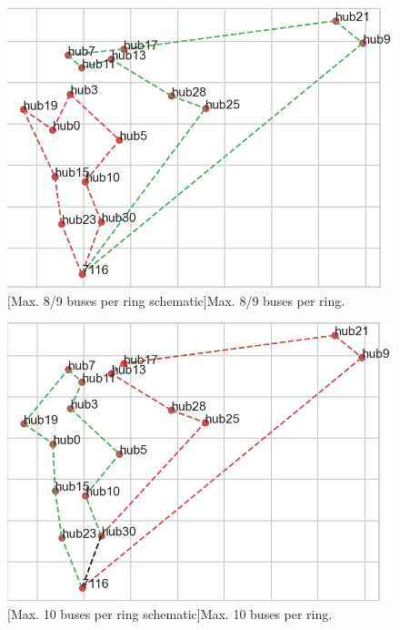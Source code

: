 
\begin{figure}
	\centering
	\begin{minipage}{.5\textwidth}
		\centering
		\includegraphics[width=1\linewidth]{figures/experiments/ringsize/size_8_9.png}
		[Max. 8/9 buses per ring schematic]{Max. 8/9 buses per ring.}
		\label{fig:ringsize_89}
	\end{minipage}%
	\begin{minipage}{.5\textwidth}
		\centering
		\includegraphics[width=1\linewidth]{figures/experiments/ringsize/size_10.png}
		[Max. 10 buses per ring schematic]{Max. 10 buses per ring.}
		\label{fig:ringsize_10}
	\end{minipage}
\end{figure}